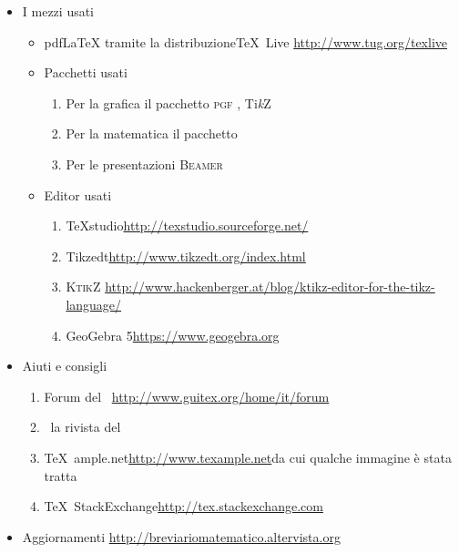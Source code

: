 	\begin{itemize}
		\item I mezzi usati
		\begin{itemize}
			\item pdf\LaTeX{} tramite la distribuzione\TeX{}~Live\newline
			\url{http://www.tug.org/texlive}
			\item Pacchetti usati
			\begin{enumerate}
				\item Per la grafica  il pacchetto \textsc{pgf} \pgfversion, Ti\emph{k}Z
				\item Per la matematica il pacchetto \AmS
				\item Per le presentazioni \textsc{Beamer}
			\end{enumerate}
			\item Editor usati
			\begin{enumerate}
				\item \TeX{}studio\newline \url{http://texstudio.sourceforge.net/} %
				\item Tikzedt\newline \url{http://www.tikzedt.org/index.html} %
				\item \textsc{KtikZ}\newline%
				\url{http://www.hackenberger.at/blog/ktikz-editor-for-the-tikz-language/}
				\item GeoGebra 5\newline\url{https://www.geogebra.org}
			\end{enumerate}
		\end{itemize}
		\item Aiuti e consigli
		\begin{enumerate}
			\item Forum del \guit\ \GuITtext\newline \url{http://www.guitex.org/home/it/forum}
			\item \Ars\ la rivista del \guit\
			\item \TeX{}~ample.net\newline \url{http://www.texample.net}\newline da cui qualche immagine è stata tratta
			\item \TeX{}~StackExchange\newline \url{http://tex.stackexchange.com}
		\end{enumerate}
	\item Aggiornamenti
	    \url{http://breviariomatematico.altervista.org}
	\end{itemize}
	\clearpage